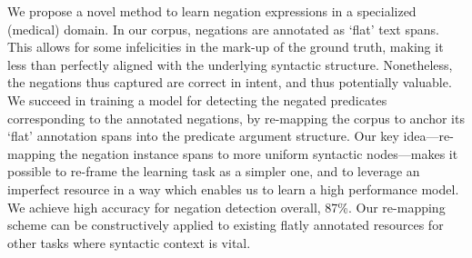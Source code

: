We propose a novel method to learn negation expressions in a specialized (medical) domain. In our corpus, negations are annotated as ‘flat' text spans. This allows for some infelicities in the mark-up of the ground truth, making it less than perfectly aligned with the underlying syntactic structure. Nonetheless, the negations thus captured are correct in intent, and thus potentially valuable. We succeed in training a model for detecting the negated predicates corresponding to the annotated negations, by re-mapping the corpus to anchor its ‘flat' annotation spans into the predicate argument structure. Our key idea—re-mapping the negation instance spans to more uniform syntactic nodes—makes it possible to re-frame the learning task as a simpler one, and to leverage an imperfect resource in a way which enables us to learn a high performance model. We achieve high accuracy for negation detection overall, 87\%. Our re-mapping scheme can be constructively applied to existing flatly annotated resources for other tasks where syntactic context is vital.
